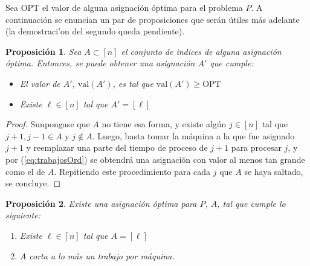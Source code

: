 \documentclass[10pt]{article}
\newcommand{\val}[1]{\text{val}(#1)}
\theoremstyle{plain}
\newtheorem{prop}{Proposición}
\theoremstyle{definition}
\begin{document}
%



Sea $\text{OPT}$ el valor de alguna asignación \'optima para el problema $P$. A continuación se enuncian un par de proposiciones que serán \'utiles m\'as adelante (la demostraci'on del segundo queda pendiente).

\begin{prop}
Sea $A\subset [n]$ el conjunto de indices de alguna asignaci\'on \'optima. Entonces, se puede obtener una 
asignaci\'on  $A'$ que cumple:
\begin{itemize}
\item El valor de $A'$, $\val{A'}$, es tal que $\val{A'} \geq \text{OPT}$
\item Existe $\ell \in [n]$ tal que $A' = [\ell]$ 
\end{itemize}
\end{prop}
\begin{proof}

Sunpongase que $A$ no tiene esa forma, y existe algún $j \in [n]$ tal que $j+1,j-1 \in A$ y $j \not \in A$. Luego, basta tomar la máquina a la que fue asignado $j+1$ y reemplazar una parte del tiempo de proceso de $j+1$ para procesar $j$, y por (\ref{eq:trabajosOrd}) se obtendr\'a una asignaci\'on con valor al menos tan grande como el de $A$. Repitiendo este procedimiento para cada $j$ que $A$ se haya saltado, se concluye.
\end{proof}

\begin{prop}
Existe una asignación óptima para $P$, $A$, tal que cumple lo siguiente:
\begin{enumerate}
\item Existe $\ell \in [n]$ tal que $A = [\ell]$
\item $A$ corta a lo m\'as un trabajo por m\'aquina.
\end{enumerate}
\end{prop}


%
\end{document}
